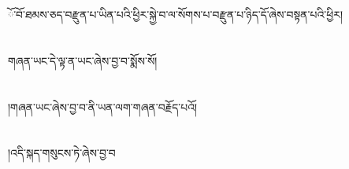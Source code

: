 ོ་བོ་ཐམས་ཅད་བརྫུན་པ་ཡིན་པའི་ཕྱིར་སྐྱེ་བ་ལ་སོགས་པ་བརྫུན་པ་ཉིད་དོ་ཞེས་བསྟན་པའི་ཕྱིར།\chapter{ }གཞན་ཡང་དེ་ལྟ་ན་ཡང་ཞེས་བྱ་བ་སྨོས་སོ།\chapter{ }།གཞན་ཡང་ཞེས་བྱ་བ་ནི་ཡན་ལག་གཞན་བརྗོད་པའོ།\chapter{ }།འདི་སྐད་གསུངས་ཏེ་ཞེས་བྱ་བ